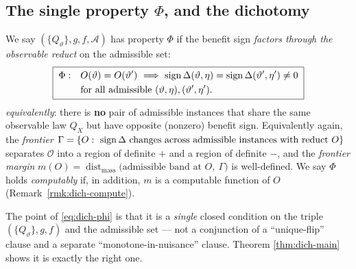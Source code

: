 \subsection{The single property $\Phi$, and the dichotomy}\label{sec:dich-phi}
\begin{definition}\label{def:dich-phi}
We say $(\{Q_\vartheta\},g,f,\mathcal A)$ has property $\Phi$ if the benefit sign
\emph{factors through the observable reduct} on the admissible set:
\begin{equation}\label{eq:dich-phi}
  \boxed{\;
  \begin{aligned}
  \Phi:\quad & O(\vartheta)=O(\vartheta')\ \Longrightarrow\
  \operatorname{sign}\Delta(\vartheta,\eta)=\operatorname{sign}\Delta(\vartheta',\eta')\neq 0\\
  & \text{for all admissible }(\vartheta,\eta),(\vartheta',\eta').
  \end{aligned}\;}
\end{equation}
\emph{equivalently}: there is \textbf{no} pair of admissible instances that share the
same observable law $Q_X$ but have opposite (nonzero) benefit sign. Equivalently
again, the \emph{frontier} $\Gamma=\{O:\ \operatorname{sign}\Delta \text{ changes across admissible
instances with reduct }O\}$ separates $\mathcal O$ into a region of definite $+$ and a
region of definite $-$, and the \emph{frontier margin}
$m(O)=\operatorname{dist}_{\mathrm{mass}}\!\big(\text{admissible band at }O,\ \Gamma\big)$
is well-defined. We say $\Phi$ holds \emph{computably} if, in addition, $m$ is a
computable function of $O$ (Remark~\ref{rmk:dich-compute}).
\end{definition}

The point of \eqref{eq:dich-phi} is that it is a \emph{single} closed condition on
the triple $(\{Q_\vartheta\},g,f)$ and the admissible set --- not a conjunction of a
``unique-flip'' clause and a separate ``monotone-in-nuisance'' clause. Theorem
\ref{thm:dich-main} shows it is exactly the right one.

